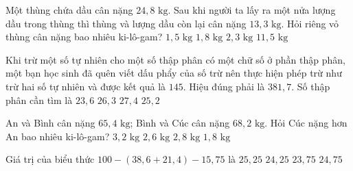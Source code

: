 \begin{ex} %
Một thùng chứa dầu cân nặng $24{,}8\text{ kg}$. Sau khi người ta lấy ra một nửa lượng dầu trong thùng thì thùng và lượng dầu còn lại cân nặng $13{,}3\text{ kg}$. Hỏi riêng vỏ thùng cân nặng bao nhiêu ki-lô-gam?
\choice
{$1{,}5\text{ kg}$}
{\True $1{,}8\text{ kg}$}
{$2{,}3\text{ kg}$}
{$11{,}5\text{ kg}$}
\end{ex}

\begin{ex} %
Khi trừ một số tự nhiên cho một số thập phân có một chữ số ở phần thập phân, một bạn học sinh đã quên viết dấu phẩy của số trừ nên thực hiện phép trừ như trừ hai số tự nhiên và được kết quả là $145$. Hiệu đúng phải là $381{,}7$. Số thập phân cần tìm là
\choice
{$23{,}6$}
{\True $26{,}3$}
{$27{,}4$}
{$25{,}2$}
\end{ex}

\begin{ex} %
An và Bình cân nặng $65{,}4\text{ kg}$; Bình và Cúc cân nặng $68{,}2\text{ kg}$. Hỏi Cúc nặng hơn An bao nhiêu ki-lô-gam?
\choice
{$3{,}2\text{ kg}$}
{$2{,}6\text{ kg}$}
{\True $2{,}8\text{ kg}$}
{$1{,}8\text{ kg}$}
\end{ex}

\begin{ex} %
Giá trị của biểu thức $100 - (38{,}6 + 21{,}4) - 15{,}75$ là
\choice
{$25{,}25$}
{\True $24{,}25$}
{$23{,}75$}
{$24{,}75$}
\end{ex}

